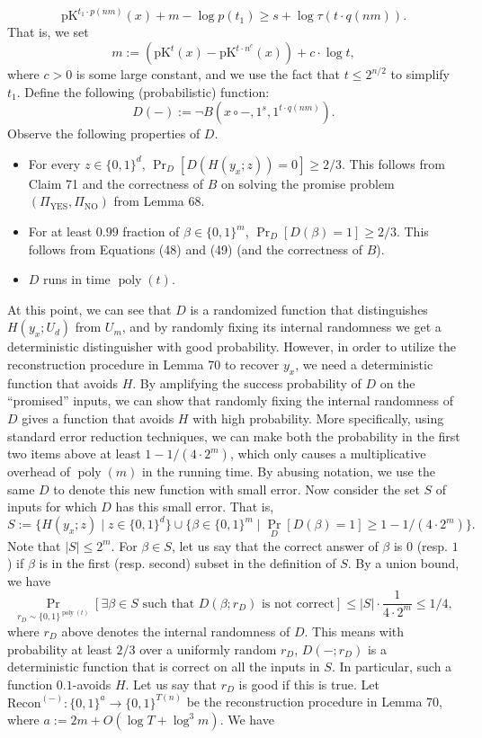 \documentclass[10pt,a4paper]{article}
\begin{document}
\[\mathrm{pK}^{t_1\cdot p(nm)}(x)+m-\log p(t_1)\geq s+\log\tau(t\cdot q(nm)).\tag{49}\]
That is, we set
\[m:=(\mathrm{pK}^t(x)-\mathrm{pK}^{t\cdot n^c}(x))+c\cdot\log t,\]
where $c>0$ is some large constant, and we use the fact that $t\leq2^{n/2}$ to simplify $t_1$. Define the following (probabilistic) function:
\[D(-):=\neg B(x\circ-,1^s,1^{t\cdot q(nm)}).\]
Observe the following properties of $D$.
\begin{itemize}
\item For every $z\in\{0,1\}^d$, $\Pr_D[D(H(y_x;z))=0]\geq2/3$. This follows from Claim 71 and the correctness of $B$ on solving the promise problem $(\Pi_{\mathrm{YES}},\Pi_{\mathrm{NO}})$ from Lemma 68.
\item For at least $0.99$ fraction of $\beta\in\{0,1\}^m$, $\Pr_D[D(\beta)=1]\geq2/3$. This follows from Equations (48) and (49) (and the correctness of $B$).
\item $D$ runs in time $\operatorname{poly}(t)$.
\end{itemize}
At this point, we can see that $D$ is a randomized function that distinguishes $H(y_x;U_d)$ from $U_m$, and by randomly fixing its internal randomness we get a deterministic distinguisher with good probability. However, in order to utilize the reconstruction procedure in Lemma 70 to recover $y_x$, we need a deterministic function that avoids $H$. By amplifying the success probability of $D$ on the ``promised'' inputs, we can show that randomly fixing the internal randomness of $D$ gives a function that avoids $H$ with high probability. More specifically, using standard error reduction techniques, we can make both the probability in the first two items above at least $1-1/(4\cdot2^m)$, which only causes a multiplicative overhead of $\operatorname{poly}(m)$ in the running time. By abusing notation, we use the same $D$ to denote this new function with small error. Now consider the set $S$ of inputs for which $D$ has this small error. That is,
\[S:=\{H(y_x;z)\mid z\in\{0,1\}^d\}\cup\{\beta\in\{0,1\}^m\mid\Pr_D[D(\beta)=1]\geq1-1/(4\cdot2^m)\}.\]
Note that $|S|\leq2^m$. For $\beta\in S$, let us say that the correct answer of $\beta$ is $0$ (resp. $1$) if $\beta$ is in the first (resp. second) subset in the definition of $S$. By a union bound, we have
\[\Pr_{r_D\sim\{0,1\}^{\operatorname{poly}(t)}}[\exists\beta\in S\text{ such that }D(\beta;r_D)\text{ is not correct}]\leq|S|\cdot\frac1{4\cdot2^m}\leq1/4,\tag{50}\]
where $r_D$ above denotes the internal randomness of $D$. This means with probability at least $2/3$ over a uniformly random $r_D$, $D(-;r_D)$ is a deterministic function that is correct on all the inputs in $S$. In particular, such a function $0.1$-avoids $H$. Let us say that $r_D$ is good if this is true. Let $\mathrm{Recon}^{(-)}:\{0,1\}^a\to\{0,1\}^{T(n)}$ be the reconstruction procedure in Lemma 70, where $a:=2m+O(\log T+\log^3m)$. We have
\end{document}

